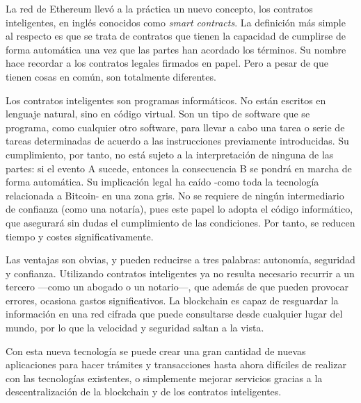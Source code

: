   La red de Ethereum llevó a la práctica un nuevo concepto, los contratos inteligentes, en inglés conocidos como \textit{smart contracts}. 
  La definición más simple al respecto es que se trata de contratos que tienen la capacidad de cumplirse de forma automática una vez que 
  las partes han acordado los términos. Su nombre hace recordar a los contratos legales firmados en papel. Pero a pesar de que tienen 
  cosas en común, son totalmente diferentes. 

  Los contratos inteligentes son programas informáticos. No están escritos en lenguaje natural, sino en código virtual. Son un 
  tipo de software que se programa, como cualquier otro software, para llevar a cabo una tarea o serie de tareas determinadas de acuerdo a 
  las instrucciones previamente introducidas. Su cumplimiento, por tanto, no está sujeto a la interpretación de ninguna de las partes: si 
  el evento A sucede, entonces la consecuencia B se pondrá en marcha de forma automática. Su implicación legal ha caído -como toda la 
  tecnología relacionada a Bitcoin- en una zona gris. No se requiere de ningún intermediario de confianza (como una notaría), pues este 
  papel lo adopta el código informático, que asegurará sin dudas el cumplimiento de las condiciones. Por tanto, se reducen tiempo y costes 
  significativamente. ~\parencite{smartcontract}


  Las ventajas son obvias, y pueden reducirse a tres palabras: autonomía, seguridad y confianza. Utilizando contratos inteligentes ya no 
  resulta necesario recurrir a un tercero —como un abogado o un notario—, que además de que pueden provocar errores, ocasiona gastos 
  significativos. La blockchain es capaz de resguardar la información en una red cifrada que puede consultarse desde cualquier lugar del 
  mundo, por lo que la velocidad y seguridad saltan a la vista.

  Con esta nueva tecnología se puede crear una gran cantidad de nuevas aplicaciones para hacer trámites y transacciones hasta ahora
  difíciles de realizar con las tecnologías existentes, o simplemente mejorar servicios gracias a la descentralización
  de la blockchain y de los contratos inteligentes.

